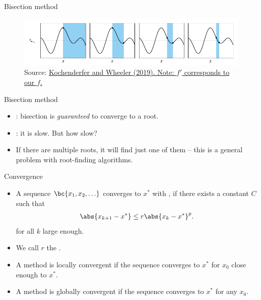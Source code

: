 \documentclass[11pt,xcolor={dvipsnames},aspectratio=159,hyperref={pdftex,pdfpagemode=UseNone,hidelinks,pdfdisplaydoctitle=true},usepdftitle=false]{beamer}
\begin{document}
\begin{frame}{Bisection method}
    \begin{figure}    
    \centering
        
        \includegraphics[width=1\textwidth]{bisection.png}
        \caption{Source: \href{https://mitpress.mit.edu/9780262039420/}{Kochenderfer and Wheeler (2019). Note: $f'$ corresponds to our $f$.}}
        \end{figure}
    \end{frame}
    

\begin{frame}{Bisection method}
    
    \begin{itemize}
    
        \item {}: bisection is \emph{guaranteed} to converge to a root.
        \item {}: it is slow. But how slow? 
        \item If there are multiple roots, it will find just one of them -- this is a general problem with root-finding algorithms.        

\end{itemize}
\end{frame}

\begin{frame}{Convergence}
    
    \begin{itemize}
        \item A sequence $\bc{x_1,x_2,\ldots}$ converges to $x^*$ with , if there exists a constant $C$ such that \begin{align*}
            \abs{x_{k+1} - x^*} \leq r \abs{x_k - x^*}^p.
        \end{align*}
        for all $k$ large enough.
        \item We call $r$ the . 
        \item A method is locally convergent if the sequence converges to $x^*$ for $x_0$ close enough to $x^*$.
        \item A method is globally convergent if the sequence converges to $x^*$ for any $x_0$.
\end{itemize}
\end{frame}
\end{document}
